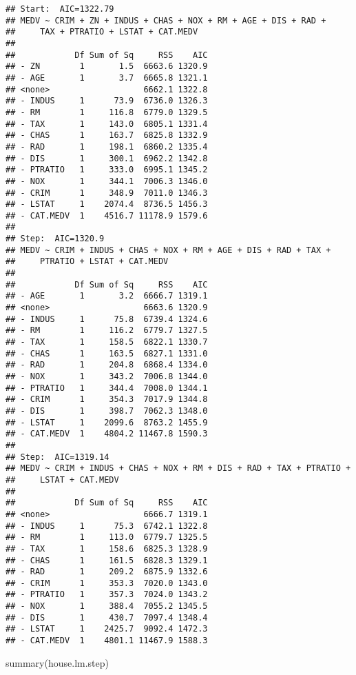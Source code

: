 \documentclass[
]{article}
\newenvironment{Shaded}{\begin{snugshade}}{\end{snugshade}}
\newcommand{\FunctionTok}[1]{\textcolor[rgb]{0.00,0.00,0.00}{#1}}
\newcommand{\NormalTok}[1]{#1}
\begin{document}
\begin{verbatim}
## Start:  AIC=1322.79
## MEDV ~ CRIM + ZN + INDUS + CHAS + NOX + RM + AGE + DIS + RAD + 
##     TAX + PTRATIO + LSTAT + CAT.MEDV
## 
##            Df Sum of Sq     RSS    AIC
## - ZN        1       1.5  6663.6 1320.9
## - AGE       1       3.7  6665.8 1321.1
## <none>                   6662.1 1322.8
## - INDUS     1      73.9  6736.0 1326.3
## - RM        1     116.8  6779.0 1329.5
## - TAX       1     143.0  6805.1 1331.4
## - CHAS      1     163.7  6825.8 1332.9
## - RAD       1     198.1  6860.2 1335.4
## - DIS       1     300.1  6962.2 1342.8
## - PTRATIO   1     333.0  6995.1 1345.2
## - NOX       1     344.1  7006.3 1346.0
## - CRIM      1     348.9  7011.0 1346.3
## - LSTAT     1    2074.4  8736.5 1456.3
## - CAT.MEDV  1    4516.7 11178.9 1579.6
## 
## Step:  AIC=1320.9
## MEDV ~ CRIM + INDUS + CHAS + NOX + RM + AGE + DIS + RAD + TAX + 
##     PTRATIO + LSTAT + CAT.MEDV
## 
##            Df Sum of Sq     RSS    AIC
## - AGE       1       3.2  6666.7 1319.1
## <none>                   6663.6 1320.9
## - INDUS     1      75.8  6739.4 1324.6
## - RM        1     116.2  6779.7 1327.5
## - TAX       1     158.5  6822.1 1330.7
## - CHAS      1     163.5  6827.1 1331.0
## - RAD       1     204.8  6868.4 1334.0
## - NOX       1     343.2  7006.8 1344.0
## - PTRATIO   1     344.4  7008.0 1344.1
## - CRIM      1     354.3  7017.9 1344.8
## - DIS       1     398.7  7062.3 1348.0
## - LSTAT     1    2099.6  8763.2 1455.9
## - CAT.MEDV  1    4804.2 11467.8 1590.3
## 
## Step:  AIC=1319.14
## MEDV ~ CRIM + INDUS + CHAS + NOX + RM + DIS + RAD + TAX + PTRATIO + 
##     LSTAT + CAT.MEDV
## 
##            Df Sum of Sq     RSS    AIC
## <none>                   6666.7 1319.1
## - INDUS     1      75.3  6742.1 1322.8
## - RM        1     113.0  6779.7 1325.5
## - TAX       1     158.6  6825.3 1328.9
## - CHAS      1     161.5  6828.3 1329.1
## - RAD       1     209.2  6875.9 1332.6
## - CRIM      1     353.3  7020.0 1343.0
## - PTRATIO   1     357.3  7024.0 1343.2
## - NOX       1     388.4  7055.2 1345.5
## - DIS       1     430.7  7097.4 1348.4
## - LSTAT     1    2425.7  9092.4 1472.3
## - CAT.MEDV  1    4801.1 11467.9 1588.3
\end{verbatim}

\begin{Shaded}
\begin{Highlighting}[]
\FunctionTok{summary}\NormalTok{(house.lm.step)}
\end{Highlighting}
\end{Shaded}
\end{document}
